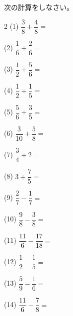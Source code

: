 \documentclass[a4paper, 11pt]{ltjsarticle}
\begin{document}
次の計算をしなさい。


\vspace*{5ex}

\begin{multicols*}{2}
\noindent (1) \quad $\dfrac{3}{8}+\dfrac{4}{8} =$
\vspace*{\fill}

\noindent (2) \quad $\dfrac{1}{6}+\dfrac{2}{6} =$
\vspace*{\fill}

\noindent (3) \quad $\dfrac{1}{2}+\dfrac{5}{6} =$
\vspace*{\fill}

\noindent (4) \quad $\dfrac{1}{2}+\dfrac{1}{5} =$
\vspace*{\fill}

\noindent (5) \quad $\dfrac{5}{6}+\dfrac{3}{5} =$
\vspace*{\fill}

\noindent (6) \quad $\dfrac{3}{10}+\dfrac{5}{8} =$
\vspace*{\fill}

\noindent (7) \quad $\dfrac{3}{4}+2 =$
\vspace*{\fill}

\noindent (8) \quad $3+\dfrac{7}{5} =$
\vspace*{\fill}
\columnbreak

\noindent (9) \quad $\dfrac{2}{7}-\dfrac{1}{7} =$
\vspace*{\fill}

\noindent (10) \quad $\dfrac{9}{8}-\dfrac{3}{8} =$
\vspace*{\fill}

\noindent (11) \quad $\dfrac{11}{6}-\dfrac{17}{18} =$
\vspace*{\fill}

\noindent (12) \quad $\dfrac{1}{2}-\dfrac{1}{5} =$
\vspace*{\fill}

\noindent (13) \quad $\dfrac{5}{9}-\dfrac{1}{6} =$
\vspace*{\fill}

\noindent (14) \quad $\dfrac{11}{6}-\dfrac{7}{8} =$
\vspace*{\fill}


\end{multicols*}
\end{document}

